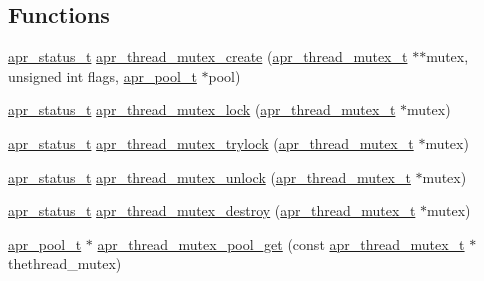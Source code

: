 \subsection*{Functions}
\begin{DoxyCompactItemize}
\item 
\hyperlink{group__apr__errno_gaf76ee4543247e9fb3f3546203e590a6c}{apr\-\_\-status\-\_\-t} \hyperlink{group__apr__thread__mutex_ga927e99580a669f577fbcb6508814ff12}{apr\-\_\-thread\-\_\-mutex\-\_\-create} (\hyperlink{group__apr__thread__mutex_ga95712060ba3a192036416e1ccef1db75}{apr\-\_\-thread\-\_\-mutex\-\_\-t} $\ast$$\ast$mutex, unsigned int flags, \hyperlink{group__apr__pools_gaf137f28edcf9a086cd6bc36c20d7cdfb}{apr\-\_\-pool\-\_\-t} $\ast$pool)
\item 
\hyperlink{group__apr__errno_gaf76ee4543247e9fb3f3546203e590a6c}{apr\-\_\-status\-\_\-t} \hyperlink{group__apr__thread__mutex_ga1430fd10d8d260c0e3832c959742a977}{apr\-\_\-thread\-\_\-mutex\-\_\-lock} (\hyperlink{group__apr__thread__mutex_ga95712060ba3a192036416e1ccef1db75}{apr\-\_\-thread\-\_\-mutex\-\_\-t} $\ast$mutex)
\item 
\hyperlink{group__apr__errno_gaf76ee4543247e9fb3f3546203e590a6c}{apr\-\_\-status\-\_\-t} \hyperlink{group__apr__thread__mutex_ga6ac9c8ebee83ff89416f00231a858798}{apr\-\_\-thread\-\_\-mutex\-\_\-trylock} (\hyperlink{group__apr__thread__mutex_ga95712060ba3a192036416e1ccef1db75}{apr\-\_\-thread\-\_\-mutex\-\_\-t} $\ast$mutex)
\item 
\hyperlink{group__apr__errno_gaf76ee4543247e9fb3f3546203e590a6c}{apr\-\_\-status\-\_\-t} \hyperlink{group__apr__thread__mutex_ga74e58f753737283f9b826d8cdcbcb4bf}{apr\-\_\-thread\-\_\-mutex\-\_\-unlock} (\hyperlink{group__apr__thread__mutex_ga95712060ba3a192036416e1ccef1db75}{apr\-\_\-thread\-\_\-mutex\-\_\-t} $\ast$mutex)
\item 
\hyperlink{group__apr__errno_gaf76ee4543247e9fb3f3546203e590a6c}{apr\-\_\-status\-\_\-t} \hyperlink{group__apr__thread__mutex_gae80e6f9c2a2fbaa94f5a6954e02118f4}{apr\-\_\-thread\-\_\-mutex\-\_\-destroy} (\hyperlink{group__apr__thread__mutex_ga95712060ba3a192036416e1ccef1db75}{apr\-\_\-thread\-\_\-mutex\-\_\-t} $\ast$mutex)
\item 
\hyperlink{group__apr__pools_gaf137f28edcf9a086cd6bc36c20d7cdfb}{apr\-\_\-pool\-\_\-t} $\ast$ \hyperlink{group__apr__thread__mutex_gafec9362d92f8bd67660b97cb3c246544}{apr\-\_\-thread\-\_\-mutex\-\_\-pool\-\_\-get} (const \hyperlink{group__apr__thread__mutex_ga95712060ba3a192036416e1ccef1db75}{apr\-\_\-thread\-\_\-mutex\-\_\-t} $\ast$thethread\-\_\-mutex)
\end{DoxyCompactItemize}


